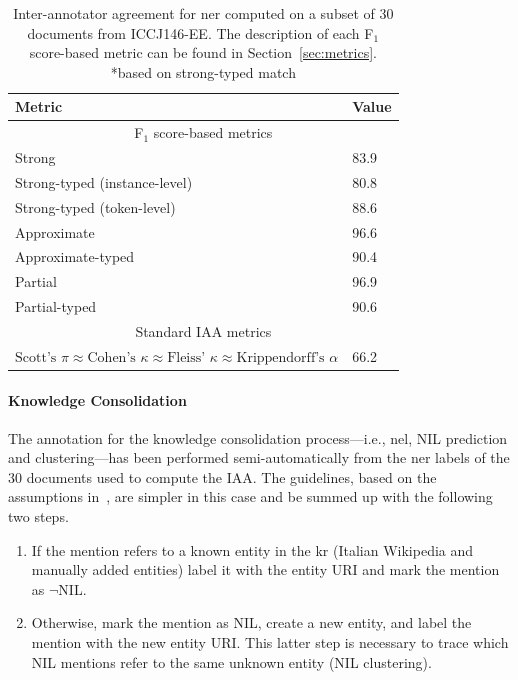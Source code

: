 \begin{table}[]
\centering
\begin{tabular}{l|l}
\toprule
\textbf{Metric}                     & \textbf{Value} \\\toprule
\multicolumn{2}{c}{F$_1$ score-based metrics} \\\midrule
Strong                              & 83.9           \\
Strong-typed (instance-level)       & 80.8           \\
Strong-typed (token-level)          & 88.6           \\
Approximate                         & 96.6           \\
Approximate-typed                   & 90.4           \\
Partial                             & 96.9           \\
Partial-typed                       & 90.6           \\\midrule
\multicolumn{2}{c}{Standard IAA metrics} \\\midrule
$\text{Scott's~}\pi \approx \text{Cohen's~}\kappa \approx \text{Fleiss'~}\kappa \approx \text{Krippendorff's~}\alpha$
 & 66.2           \\\bottomrule
\end{tabular}
\caption{Inter-annotator agreement for \ac{ner} computed on a subset of 30 documents from ICCJ146-EE. The description of each F$_1$ score-based metric can be found in Section~\ref{sec:metrics}. *based on strong-typed match}
\label{tab:iaa}
\end{table}


\paragraph{Knowledge Consolidation}
The annotation for the knowledge consolidation process---i.e., \ac{nel}, NIL prediction and clustering---has been performed semi-automatically from the \ac{ner} labels of the 30 documents used to compute the IAA. The guidelines, based on the assumptions in~\cite{jha2017all}, are simpler in this case and be summed up with the following two steps.

\begin{enumerate}
    \item If the mention refers to a known entity in the \ac{kr} (Italian Wikipedia and manually added entities) label it with the entity URI and mark the mention as $\neg$NIL.
    \item Otherwise, mark the mention as NIL, create a new entity, and label the mention with the new entity URI. This latter step is necessary to trace which NIL mentions refer to the same unknown entity (NIL clustering). 
\end{enumerate}

